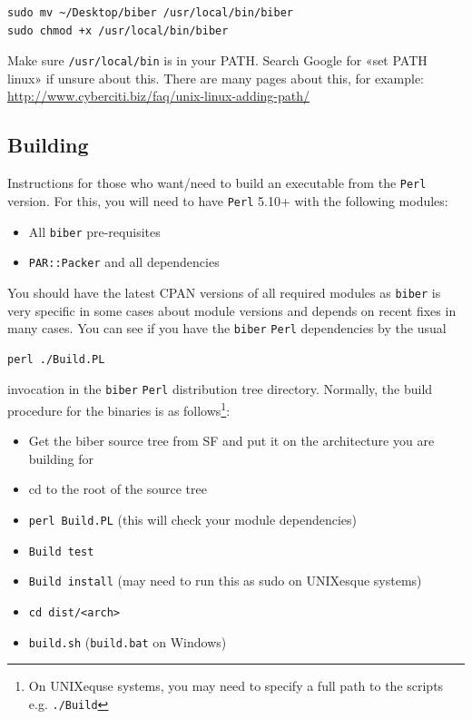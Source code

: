\documentclass{ltxdockit}
\begin{document}
\begin{verbatim}
sudo mv ~/Desktop/biber /usr/local/bin/biber
sudo chmod +x /usr/local/bin/biber
\end{verbatim}

\noindent Make sure \verb+/usr/local/bin+ is in your PATH. Search Google for «set PATH
linux» if unsure about this. There are many pages about this, for example:
\url{http://www.cyberciti.biz/faq/unix-linux-adding-path/}


\subsection{Building}

Instructions for those who want/need to build an executable from the
\verb+Perl+ version. For this, you will need to have \verb+Perl+ 5.10+ with
the following modules:

\begin{itemize}
\item All \verb+biber+ pre-requisites
\item \verb+PAR::Packer+ and all dependencies
\end{itemize}

\noindent You should have the latest CPAN versions of all required modules
as \verb+biber+ is very specific in some cases about module versions and
depends on recent fixes in many cases. You can see if you have the
\verb+biber+ \verb+Perl+ dependencies by the usual

\begin{verbatim}
perl ./Build.PL
\end{verbatim}

\noindent invocation in the \verb+biber+ \verb+Perl+ distribution tree
directory. Normally, the build procedure for the binaries is as
follows\footnote{On UNIXequse systems, you may need to specify a full
  path to the scripts e.g. \texttt{./Build}}:

\begin{itemize}
\item Get the biber source tree from SF and put it on the architecture
  you are building for
\item cd to the root of the source tree
\item \verb+perl Build.PL+ (this will check your module
  dependencies)
\item \verb+Build test+
\item \verb+Build install+ (may need to run this as sudo on
  UNIXesque systems)
\item \verb+cd dist/<arch>+
\item \verb+build.sh+ (\verb+build.bat+ on Windows)
\end{itemize}
\end{document}
